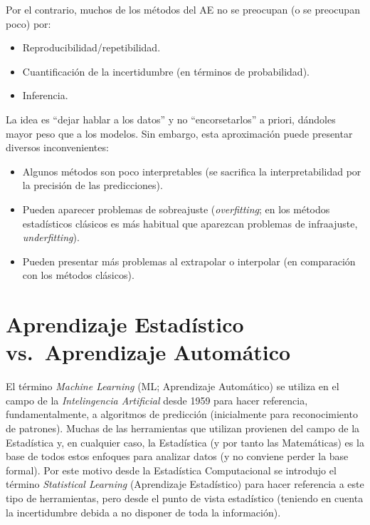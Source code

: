 \documentclass[
]{book}
\theoremstyle{break}
\theoremstyle{nonumberplain}
\begin{document}
Por el contrario, muchos de los métodos del AE no se preocupan (o se preocupan poco) por:

\begin{itemize}
\item
  Reproducibilidad/repetibilidad.
\item
  Cuantificación de la incertidumbre (en términos de probabilidad).
\item
  Inferencia.
\end{itemize}

La idea es ``dejar hablar a los datos'' y no ``encorsetarlos'' a priori, dándoles mayor peso que a los modelos.
Sin embargo, esta aproximación puede presentar diversos inconvenientes:

\begin{itemize}
\item
  Algunos métodos son poco interpretables (se sacrifica la interpretabilidad por la precisión de las predicciones).
\item
  Pueden aparecer problemas de sobreajuste (\emph{overfitting}; en los métodos estadísticos clásicos es más habitual que aparezcan problemas de infraajuste, \emph{underfitting}).
\item
  Pueden presentar más problemas al extrapolar o interpolar (en comparación con los métodos clásicos).
\end{itemize}

\hypertarget{aprendizaje-estaduxedstico-vs.-aprendizaje-automuxe1tico}{%
\section{Aprendizaje Estadístico vs.~Aprendizaje Automático}\label{aprendizaje-estaduxedstico-vs.-aprendizaje-automuxe1tico}}

El término \emph{Machine Learning} (ML; Aprendizaje Automático) se utiliza en el campo de la \emph{Intelingencia Artificial} desde 1959 para hacer referencia, fundamentalmente, a algoritmos de predicción (inicialmente para reconocimiento de patrones).
Muchas de las herramientas que utilizan provienen del campo de la Estadística y, en cualquier caso, la Estadística (y por tanto las Matemáticas) es la base de todos estos enfoques para analizar datos (y no conviene perder la base formal).
Por este motivo desde la Estadística Computacional se introdujo el término \emph{Statistical Learning} (Aprendizaje Estadístico) para hacer referencia a este tipo de herramientas, pero desde el punto de vista estadístico (teniendo en cuenta la incertidumbre debida a no disponer de toda la información).
\end{document}
